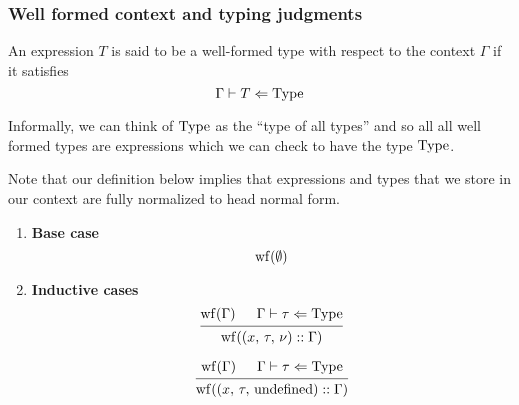 \documentclass{article}
\begin{document}
\subsubsection{Well formed context and typing judgments}
\begin{definition} 
  An expression $T$ is said to be a well-formed type with respect to the context
  $\Gamma$ if it satisfies
  \[ \Gamma \vdash T \Leftarrow \operatorname{Type} \]

  Informally, we can think of $\operatorname{Type}$ as the ``type of all types'' and so all
  all well formed types are
  expressions which we can check to have the type $\operatorname{Type}$.
\end{definition}

\begin{definition} 
  Note that our definition below implies that expressions and types that we
  store in our context are fully normalized to head normal form.

  \begin{enumerate}
  \item \textbf{Base case} \\
    \[
      \begin{prooftree}
        \hypo{\wf(\emptyset)}
      \end{prooftree}
    \]

  \item \textbf{Inductive cases} \\
    \[
      \begin{prooftree}
        \hypo{\wf(\Gamma)}
        \hypo{\Gamma \vdash \tau \Leftarrow \Type}
        \infer2{\wf ((x, \, \tau, \, \nu) :: \Gamma)}
      \end{prooftree}
    \]

    \[
      \begin{prooftree}
        \hypo{\wf(\Gamma)}
        \hypo{\Gamma \vdash \tau \Leftarrow \Type}
        \infer2{\wf ((x, \, \tau, \, \text{undefined}) :: \Gamma)}
      \end{prooftree}
    \]
  \end{enumerate}
\end{definition}
\end{document}
